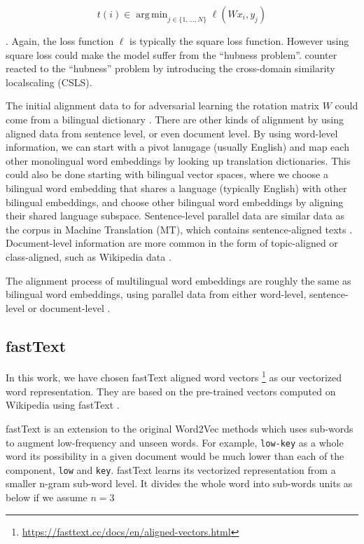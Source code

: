 \documentclass[thesis,fonts=libertine]{cluu}
\DeclareMathOperator*{\argmin}{arg\,min}
\begin{document}
\begin{equation}
  t(i) \in \argmin_{j\in \{1, ..., N\}} \ell(Wx_i, y_j)
\end{equation}

. Again, the loss function $\ell$ is typically the square loss function. However using square loss could make the model suffer from the ``hubness problem''. \cite{Conneau:2017aa} counter reacted to the ``hubness'' problem by introducing the cross-domain similarity localscaling (CSLS).

The initial alignment data to for adversarial learning the rotation matrix $W$ could come from a bilingual dictionary \parencite{Mikolov:2013ac}. There are other kinds of alignment by using aligned data from sentence level, or even document level. By using word-level information, we can start with a pivot lanugage (usually English) and map each other monolingual word embeddings by looking up translation dictionaries. This could also be done starting with bilingual vector spaces, where we choose a bilingual word embedding that shares a language (typically English) with other bilingual embeddings, and choose other bilingual word embeddings by aligning their shared language subspace. Sentence-level parallel data are similar data as the corpus in Machine Translation (MT), which contains sentence-aligned texts \parencite{Hermann:2013aa}. Document-level information are more common in the form of topic-aligned or class-aligned, such as Wikipedia data \parencite{vulic-moens-2013-study}.

The alignment process of multilingual word embeddings are roughly the same as bilingual word embeddings, using parallel data from either word-level, sentence-level or document-level \parencite{Ruder:2019aa}.

\subsection{fastText}

In this work, we have chosen fastText aligned word vectors \footnote{\url{https://fasttext.cc/docs/en/aligned-vectors.html}} \parencite{Joulin:2018aa} as our vectorized word representation. They are based on the pre-trained vectors computed on Wikipedia using fastText \parencite{Bojanowski:2016aa}.

fastText is an extension to the original Word2Vec methods which uses sub-words to augment low-frequency and unseen words. For example, \texttt{low-key} as a whole word its possibility in a given document would be much lower than each of the component, \texttt{low} and \texttt{key}. fastText learns its vectorized representation from a smaller n-gram sub-word level. It divides the whole word into sub-words units as below if we assume $n=3$
\end{document}
